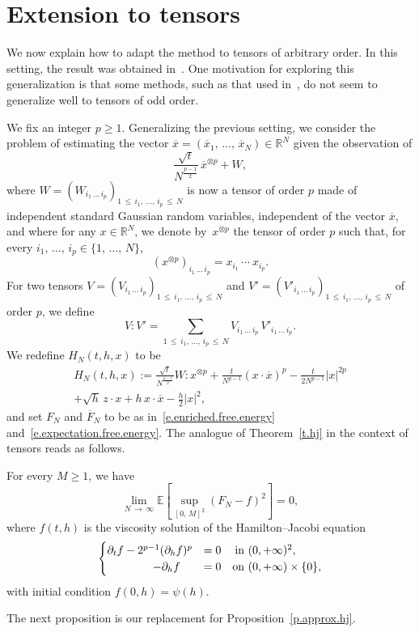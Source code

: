 \documentclass[AHL,Unicode,longabstracts,published]{cedram}
\newcommand{\R}{\mathbb{R}}
\newcommand{\E}{\mathbb{E}}
\newcommand{\1}{\mathds{1}}
\renewcommand{\le}{\leqslant}
\renewcommand{\ge}{\geqslant}
\renewcommand{\bar}{\overline}
\begin{document}
\section{Extension to tensors}\label{s.tensor}

We now explain how to adapt the method to tensors of arbitrary order. In this setting, the result was obtained in~\cite{bm1,les}. One motivation for exploring this generalization is that some methods, such as that used in~\cite{eak}, do not seem to generalize well to tensors of odd order.


We fix an integer $p \ge 1$. Generalizing the previous setting, we consider the problem of estimating the vector $\bar x = (\bar x_1,\,\ldots,\,\bar x_N) \in \R^N$ given the observation of
\[
\frac{\sqrt{t}}{N^{\frac{p-1}{2}}} \, \bar x^{\otimes p}+ W,
\]
where $W = (W_{i_1\,\ldots\,i_p})_{1 \,\le\,i_1,\,\ldots,\,i_p\,\le\,N}$ is now a tensor of order $p$ made of independent standard Gaussian random variables, independent of the vector $\bar x$, and where for any $x \in \R^N$, we denote by~$x^{\otimes p}$ the tensor of order $p$ such that, for every $i_1,\,\ldots,\,i_p \in \{1,\,\ldots,\,N\}$,
\[
(x^{\otimes p})_{i_1\,\ldots\,i_p} = x_{i_1} \, \cdots \ x_{i_p}.
\]
For two tensors $V = (V_{i_1\,\ldots\,i_p})_{1\,\le\,i_1,\,\ldots,\,i_p\,\le\,N}$ and $V' = (V'_{i_1\,\ldots\,i_p})_{1\,\le\,i_1,\,\ldots,\,i_p\,\le\,N}$ of order $p$, we define
\[
V : V' = \sum_{1\,\le\,i_1,\,\ldots,\,i_p\,\le\,N} V_{i_1\,\ldots \,i_p} \, V'_{i_1\,\ldots\,i_p}.
\]
We redefine $H_N(t,h,x)$ to be
\begin{multline*}
H_N(t,{h},x) :=
\frac{\sqrt{t}}{N^{\frac{p-1}{2}}} W : x^{\otimes p} + \frac t {N^{p-1}} (x \cdot \bar x)^p - \frac t {2N^{p-1}} |x|^{2p}
\\
+ \sqrt{h} \, z \cdot x + {h} \, x \cdot \bar x - \frac {h} 2 |x|^2,
\end{multline*}
and set $F_N$ and $\bar F_N$ to be as in~\eqref{e.enriched.free.energy} and~\eqref{e.expectation.free.energy}. The analogue of Theorem~\ref{t.hj} in the context of tensors reads as follows.



\begin{theo}[Convergence to HJ]\label{t.hj.tensor}
For every $M \ge 1$, we have
\[
\lim_{N\,\to\,\infty} \E \left[\sup_{\left[0,\,M\right]^2} (F_N - f)^2 \right] = 0,
\]
where $f(t,h)$ is the viscosity solution of the Hamilton--Jacobi equation
\begin{equation}\label{e.hj.tensor}
\begin{cases}
\partial_t f - 2^{p-1}(\partial_{h} f)^p & = 0 \quad\:  \text{in } (0,+\infty)^2, \\
\mkern73mu- \partial_h f & = 0 \quad \text{on } (0,+\infty) \times \{0\},
\end{cases}
\end{equation}
with initial condition $f(0,h) = \psi(h)$.
\end{theo}
The next proposition is our replacement for Proposition~\ref{p.approx.hj}.
\end{document}
